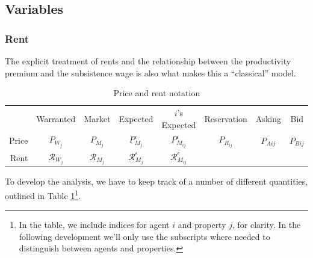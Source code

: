 \subsection {Variables}

\subsubsection{Rent} \label{sec-Rent}
The explicit treatment of rents and the relationship between the productivity \gls{premium} and the \gls{subsistence wage}
is also what makes this a ``\gls{classical}'' model. 


\begin{table}[!ht]
\centering
{\renewcommand{\arraystretch}{1.6}
\begin{tabular}{r|c|c|c|c|c|c|c|}\cline{2-8}
       & Warranted  & Market & Expected & $i$'s Expected & Reservation & Asking & Bid     \\ \cline{2-8}
Price  & $P_{W_j}$      & $P_{M_j}$  & $P_{M_j}^\epsilon$ & $P_{M_{ij}}^{\epsilon}$     & $P_{R_{ij}}$       & $P_{A{ij}}$  & $P_{B{ij}}$   \\ \cline{2-8}
Rent  & $\mathcal{R}_{W_j}$      & $\mathcal{R}_{M_j}$  & $\mathcal{R}_{M_j}^\epsilon$ & $\mathcal{R}_{M_{ij}}^{\epsilon}$     &       &   &   \\ \cline{2-8}
\end{tabular}
 }   
\caption{Price and rent notation}
\label{table-price-notation}
\end{table}


To develop the analysis, we have to keep track of a number of different quantities, outlined in Table \ref{table-price-notation}\footnote{In the table, we include indices for agent $i$ and property $j$, for clarity. In the following development we'll only use the subscripts where needed to distinguish between agents and properties.}. 

